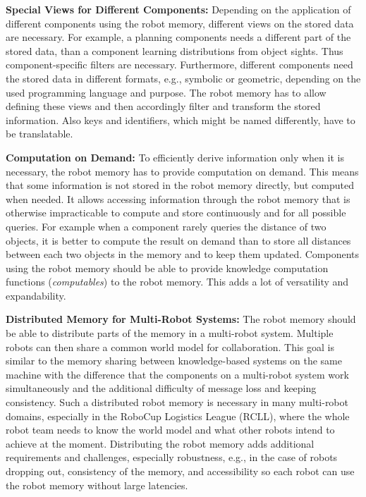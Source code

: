 \textbf{Special Views for Different Components:} Depending on the
application of different components using the robot memory, different
views on the stored data are necessary. For example, a planning
components needs a different part of the stored data, than a component
learning distributions from object sights. Thus component-specific
filters are necessary. Furthermore, different components need the
stored data in different formats, e.g., symbolic or geometric,
depending on the used programming language and purpose. The robot
memory has to allow defining these views and then accordingly filter
and transform the stored information. Also keys and identifiers, which
might be named differently, have to be translatable.

\textbf{Computation on Demand:}
To efficiently derive
information only when it is necessary, the robot memory has to provide
computation on demand. This means that some information is not stored
in the robot memory directly, but computed when needed. It allows
accessing information through the robot memory that is otherwise
impracticable to compute and store continuously and for all possible
queries. For example when a component rarely queries the distance of two
objects, it is better to compute the result on demand than to store
all distances between each two objects in the memory and to keep them
updated. Components using the robot memory should be able to provide
knowledge computation functions (\emph{computables}) to the robot
memory. This adds a lot of versatility and expandability.

\textbf{Distributed Memory for Multi-Robot Systems:} The robot memory
should be able to distribute parts of the memory in a multi-robot
system. Multiple robots can then share a common world model for
collaboration. This goal is similar to the memory sharing between
knowledge-based systems on the same machine with the difference that
the components on a multi-robot system work simultaneously and the
additional difficulty of message loss and keeping consistency. Such a
distributed robot memory is necessary in many multi-robot domains,
especially in the RoboCup Logistics League (RCLL), where the whole
robot team needs to know the world model and what other robots intend
to achieve at the moment.  Distributing the robot memory adds
additional requirements and challenges, especially robustness, e.g., in
the case of robots dropping out, consistency of the memory, and
accessibility so each robot can use the robot memory without large
latencies.


